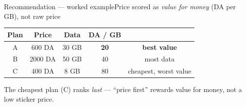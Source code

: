 \documentclass[aspectratio=169,11pt]{beamer}
\newcommand{\hd}[1]{\cellcolor{ink}\color{white}\bfseries #1}
\begin{document}
\begin{frame}{Recommendation — worked example}{Price scored as \emph{value for money} (DA per GB), not raw price}
\centering\small
\renewcommand{\arraystretch}{1.3}
\begin{tabular}{@{}c c c c c@{}}
\toprule
\rowcolor{ink}\hd{Plan} & \hd{Price} & \hd{Data} & \hd{DA / GB} & \hd{} \\
\midrule
A & 600 DA  & 30 GB & \textbf{20}  & \color{ok}\bfseries best value \\
B & 2000 DA & 50 GB & 40           & most data \\
C & 400 DA  & 8 GB  & 80           & cheapest, worst value \\
\bottomrule
\end{tabular}

\vspace{10pt}

\vspace{6pt}
{\color{muted}\scriptsize The cheapest plan (C) ranks \emph{last} — ``price first'' rewards value for money, not a low sticker price.}
\end{frame}
\end{document}
